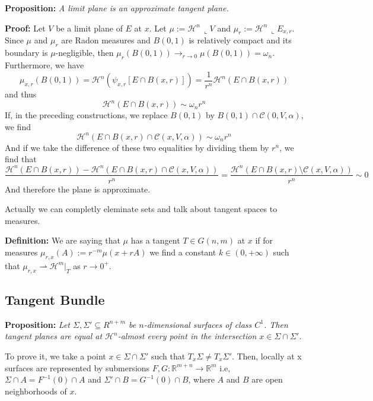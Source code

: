 \vspace{2ex}
\textbf{Proposition:} \textit{A limit plane is an approximate tangent plane.}

\vspace{1ex}
\textbf{Proof:} Let $V$ be a limit plane of $E$ at $x$. Let $\mu:= \mathcal{H}^n
\,\llcorner V$ and $\mu_r:=\mathcal{H}^n\,\llcorner E_{x,r}$. Since $\mu$ and
$\mu_r$ are Radon measures and $B(0,1)$ is relatively compact and its boundary
is $\mu$-negligible, then $\mu_r(B(0,1)) \rightarrow_{r\rightarrow 0}
\mu(B(0,1)) = \omega_n$. Furthermore, we have
\[\mu_{x,r}(B(0,1)) = \mathcal{H}^n(\psi_{x,r}[E\cap B(x, r)]) = \frac{1}{r^n}\mathcal{H}^n(E\cap B(x, r))\]
and thus
\[\mathcal{H}^n(E\cap B(x, r)) \sim \omega_n r^n\]
If, in the preceding constructions, we replace $B(0,1)$ by $B(0,1)\cap\mathcal{C}
(0,V,\alpha)$, we find
\[\mathcal{H}^n(E\cap B(x, r)\cap\mathcal{C}(x,V,\alpha)) \sim \omega_n r^n\]
And if we take the difference of these two equalities by dividing them by $r^n$,
we find that
\[\frac{\mathcal{H}^n(E\cap B(x, r)) - \mathcal{H}^n(E\cap B(x, r)\cap\mathcal{C}(x,V,\alpha))}{r^n} = \frac{\mathcal{H}^n(E\cap B(x, r)\setminus\mathcal{C}(x,V,\alpha))}{r^n} \sim 0\]
And therefore the plane is approximate.

\vspace{2ex}
Actually we can completly eleminate sets and talk about tangent spaces to
measures.

\vspace{1ex}
\textbf{Definition:} We are saying that $\mu$ has a tangent $T\in G(n,m)$ at $x$ if
for measures $\mu_{r,x}(A):=r^{-m}\mu(x+rA)$ we find a constant $k\in(0,+\infty)$
such that $\mu_{r,x}\rightharpoonup \mathcal H^m|_T$ as $r\rightarrow 0^+$.

\subsection{Tangent Bundle}
\textbf{Proposition:} \textit{Let $\Sigma, \Sigma′\subseteq R^{n+m}$ be
$n$-dimensional surfaces of class $C^1$. Then tangent planes are equal at 
$\mathcal H^n$-almost every point in the intersection $x∈\Sigma\cap\Sigma′$.}

\vspace{1ex}
To prove it, we take a point $x\in\Sigma\cap\Sigma'$ such that $T_x\Sigma\neq T_x
\Sigma'$. Then, locally at x surfaces are represented by submersions $F,G:\mathbb
R^{m+n}\rightarrow\mathbb R^m$ i.e, $\Sigma\cap A=F^{-1}(0)\cap A$ and
$\Sigma'\cap B=G^{-1}(0)\cap B$, where $A$ and $B$ are open neighborhoods of $x$.

